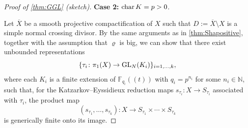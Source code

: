 \documentclass[english]{amsproc}
\theoremstyle{plain}
\newtheorem{proposition}[thm]{Proposition}
\theoremstyle{definition}
\theoremstyle{remark}
\theoremstyle{plain}
\numberwithin{equation}{thm} %
\newcommand{\bF}{\mathbb{F}}
\newcommand{\bN}{\mathbb{N}}
\newcommand{\GL}{{\rm GL}}
\begin{document}
\begin{proof}[Proof of \cref{thm:GGL} (sketch)]

		
		\medspace
		
		
		\noindent \textbf{Case 2: ${\rm char}\, K=p>0$}.  
		
		Let $\overline{X}$ be a smooth projective compactification of $X$ such that
		$D := \overline{X} \setminus X$ is a simple normal crossing divisor.
		By the same arguments as in \cref{thm:Shapositive}, together with the assumption
		that $\varrho$ is big, we can show that there exist unbounded representations
		\[
		\{\tau_i \colon \pi_1(X) \to \GL_N(K_i)\}_{i=1,\ldots,k},
		\]
		where each $K_i$ is a finite extension of $ {\bF_{q_i}((t))}$ with
		$q_i = p^{n_i}$ for some $n_i \in \bN$, such that, for the Katzarkov--Eyssidieux
		reduction maps
		$s_{\tau_i} \colon X \to S_{\tau_i}$ associated with $\tau_i$, the product map
		\[
		(s_{\tau_1}, \ldots, s_{\tau_k}) \colon X \longrightarrow
		S_{\tau_1} \times \cdots \times S_{\tau_k}
		\]
		is generically finite onto its image.
		

\end{proof}
\end{document}
